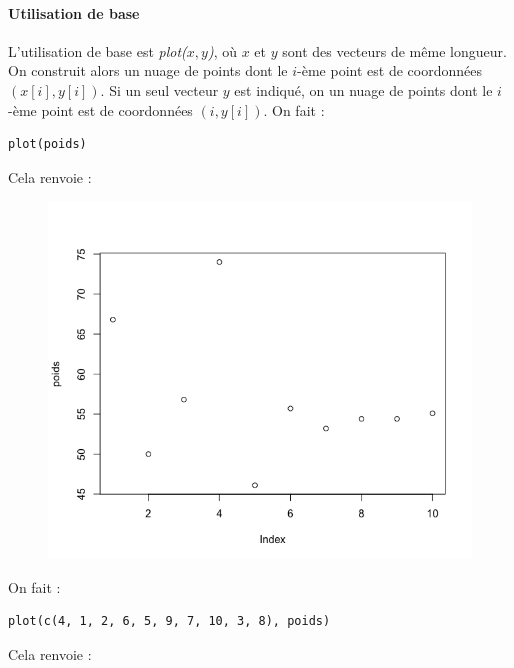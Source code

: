 \paragraph{Utilisation de base}
L'utilisation de base est \textit{plot($x, y$)}, où $x$ et $y$ sont des vecteurs de même longueur.\newline
On construit alors un nuage de points dont le $i$-ème point est de coordonnées $(x[i], y[i])$.\newline
Si un seul vecteur $y$ est indiqué, on un nuage de points dont le $i$-ème point est de coordonnées $(i, y[i])$.\newline
On fait :
\begin{lstlisting}[language=html]
plot(poids)
\end{lstlisting}
Cela renvoie :
\begin{figure}[H]\begin{center}\includegraphics[scale=0.4]{ilu/gra8.png}\end{center}\end{figure}
On fait :
\begin{lstlisting}[language=html]
plot(c(4, 1, 2, 6, 5, 9, 7, 10, 3, 8), poids)
\end{lstlisting}
Cela renvoie :

